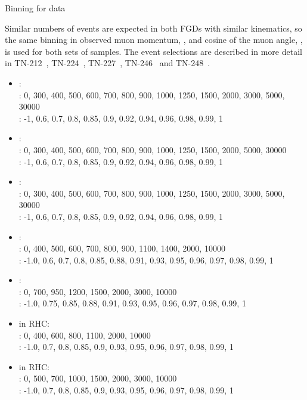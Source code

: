 


Binning for data

Similar numbers of events are expected in both FGDs with similar kinematics, so the same binning in observed muon momentum, \pmu, and cosine of the muon angle, \cosmu, is used for both sets of samples.  The event selections are described in more detail in TN-212~\cite{tn_212}, TN-224~\cite{tn_224}, TN-227~\cite{tn_227}, TN-246~\cite{tn_246} and TN-248~\cite{tn_248}.
\begin{itemize}
	\item {}: \\
	\pmu: 0, 300, 400, 500, 600, 700, 800, 900, 1000, 1250, 1500, 2000, 3000, 5000, 30000\\
	\cosmu:  -1, 0.6, 0.7, 0.8, 0.85, 0.9, 0.92, 0.94, 0.96, 0.98, 0.99, 1
	
	\item {}: \\
	\pmu:  0, 300, 400, 500, 600, 700, 800, 900, 1000, 1250, 1500, 2000, 5000, 30000\\
	\cosmu: -1, 0.6, 0.7, 0.8, 0.85, 0.9, 0.92, 0.94, 0.96, 0.98, 0.99, 1
	
	\item {}: \\
	\pmu: 0, 300, 400, 500, 600, 700, 800, 900, 1000, 1250, 1500, 2000, 3000, 5000, 30000\\
	\cosmu:  -1, 0.6, 0.7, 0.8, 0.85, 0.9, 0.92, 0.94, 0.96, 0.98, 0.99, 1
	
	\item {}: \\
	\pmu: 0, 400, 500, 600, 700, 800, 900, 1100, 1400, 2000, 10000\\
	\cosmu: -1.0, 0.6, 0.7, 0.8, 0.85, 0.88, 0.91, 0.93, 0.95, 0.96, 0.97, 0.98, 0.99, 1
	
	\item {}: \\
	\pmu: 0, 700, 950, 1200, 1500, 2000, 3000, 10000\\
	\cosmu: -1.0, 0.75, 0.85, 0.88, 0.91, 0.93, 0.95, 0.96, 0.97, 0.98, 0.99, 1
	
	\item {} in RHC: \\
	\pmu: 0, 400, 600, 800, 1100, 2000, 10000 \\
	\cosmu: -1.0, 0.7, 0.8, 0.85, 0.9, 0.93, 0.95, 0.96, 0.97, 0.98, 0.99, 1
	
	\item {} in RHC: \\
	\pmu: 0, 500, 700, 1000, 1500, 2000, 3000, 10000\\
	\cosmu: -1.0, 0.7, 0.8, 0.85, 0.9, 0.93, 0.95, 0.96, 0.97, 0.98, 0.99, 1
\end{itemize}


